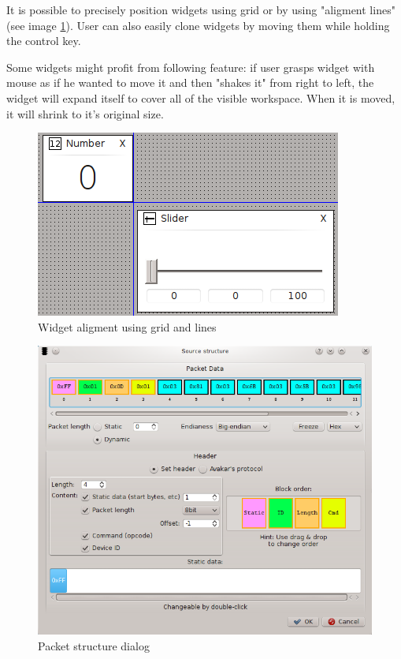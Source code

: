 \documentclass[12pt, a4paper, oneside]{article}
\begin{document}
It is possible to precisely position widgets using grid or by using "aligment lines" (see image \ref{widget_lines}). User can also easily clone widgets by moving them while holding the control key.

Some widgets might profit from following feature: if user grasps widget with mouse as if he wanted to move it and then "shakes it" from right to left, the widget will expand itself to cover all of the visible workspace. When it is moved, it will shrink to it's original size.

\begin{figure}[H]
\begin{center}
\includegraphics[scale=1]{img/lines.png}
\caption{Widget aligment using grid and lines}
\label{widget_lines}
\end{center}
\end{figure}

\begin{figure}[H]
\begin{center}
\includegraphics[scale=0.65]{img/analyzer_struct.png}
\caption{Packet structure dialog}
\label{Analyzer_struct}
\end{center}
\end{figure}
\end{document}
